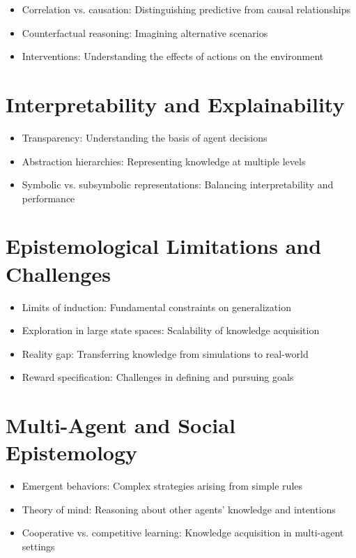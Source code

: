 \begin{itemize}
    \item Correlation vs. causation: Distinguishing predictive from causal relationships
    \item Counterfactual reasoning: Imagining alternative scenarios
    \item Interventions: Understanding the effects of actions on the environment
\end{itemize}

\section{Interpretability and Explainability}

\begin{itemize}
    \item Transparency: Understanding the basis of agent decisions
    \item Abstraction hierarchies: Representing knowledge at multiple levels
    \item Symbolic vs. subsymbolic representations: Balancing interpretability and performance
\end{itemize}

\section{Epistemological Limitations and Challenges}

\begin{itemize}
    \item Limits of induction: Fundamental constraints on generalization
    \item Exploration in large state spaces: Scalability of knowledge acquisition
    \item Reality gap: Transferring knowledge from simulations to real-world
    \item Reward specification: Challenges in defining and pursuing goals
\end{itemize}

\section{Multi-Agent and Social Epistemology}
\begin{itemize}
    \item Emergent behaviors: Complex strategies arising from simple rules
    \item Theory of mind: Reasoning about other agents' knowledge and intentions
    \item Cooperative vs. competitive learning: Knowledge acquisition in multi-agent settings
\end{itemize}

